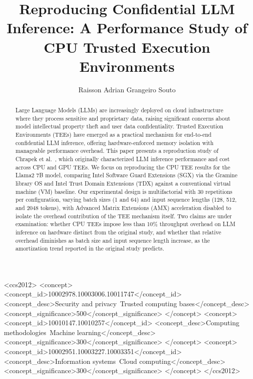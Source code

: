 \documentclass[sigconf]{acmart}
\begin{document}
\title{Reproducing Confidential LLM Inference: A Performance Study of CPU Trusted Execution Environments}

\author{Raisson Adrian Grangeiro Souto}

\begin{abstract}
Large Language Models (LLMs) are increasingly deployed on cloud infrastructure where
they process sensitive and proprietary data, raising significant concerns about model
intellectual property theft and user data confidentiality. Trusted Execution Environments
(TEEs) have emerged as a practical mechanism for end-to-end confidential LLM inference,
offering hardware-enforced memory isolation with manageable performance overhead. This
paper presents a reproduction study of Chrapek et al.~\cite{chrapek2025confidential},
which originally characterized LLM inference performance and cost across CPU and GPU
TEEs. We focus on reproducing the CPU TEE results for the Llama2 7B model, comparing
Intel Software Guard Extensions (SGX) via the Gramine library OS and Intel Trust Domain
Extensions (TDX) against a conventional virtual machine (VM) baseline. Our experimental
design is multifactorial with 30 repetitions per configuration, varying batch sizes
(1 and 64) and input sequence lengths (128, 512, and 2048 tokens), with Advanced
Matrix Extensions (AMX) acceleration disabled to isolate the overhead contribution of
the TEE mechanism itself. Two claims are under examination: whether CPU TEEs impose
less than 10\% throughput overhead on LLM inference on hardware distinct from the
original study, and whether that relative overhead diminishes as batch size and input
sequence length increase, as the amortization trend reported in the original study
predicts.
\end{abstract}

\begin{CCSXML}
<ccs2012>
 <concept>
  <concept_id>10002978.10003006.10011747</concept_id>
  <concept_desc>Security and privacy~Trusted computing bases</concept_desc>
  <concept_significance>500</concept_significance>
 </concept>
 <concept>
  <concept_id>10010147.10010257</concept_id>
  <concept_desc>Computing methodologies~Machine learning</concept_desc>
  <concept_significance>300</concept_significance>
 </concept>
 <concept>
  <concept_id>10002951.10003227.10003351</concept_id>
  <concept_desc>Information systems~Cloud computing</concept_desc>
  <concept_significance>300</concept_significance>
 </concept>
</ccs2012>
\end{CCSXML}
\end{document}
